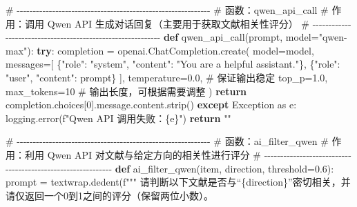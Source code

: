 \documentclass[
  letterpaper,
  DIV=11,
  numbers=noendperiod]{scrreprt}
\newenvironment{Shaded}{\begin{snugshade}}{\end{snugshade}}
\newcommand{\CommentTok}[1]{\textcolor[rgb]{0.37,0.37,0.37}{#1}}
\newcommand{\ControlFlowTok}[1]{\textcolor[rgb]{0.00,0.23,0.31}{\textbf{#1}}}
\newcommand{\DecValTok}[1]{\textcolor[rgb]{0.68,0.00,0.00}{#1}}
\newcommand{\FloatTok}[1]{\textcolor[rgb]{0.68,0.00,0.00}{#1}}
\newcommand{\ImportTok}[1]{\textcolor[rgb]{0.00,0.46,0.62}{#1}}
\newcommand{\KeywordTok}[1]{\textcolor[rgb]{0.00,0.23,0.31}{\textbf{#1}}}
\newcommand{\NormalTok}[1]{\textcolor[rgb]{0.00,0.23,0.31}{#1}}
\newcommand{\OperatorTok}[1]{\textcolor[rgb]{0.37,0.37,0.37}{#1}}
\newcommand{\PreprocessorTok}[1]{\textcolor[rgb]{0.68,0.00,0.00}{#1}}
\newcommand{\SpecialCharTok}[1]{\textcolor[rgb]{0.37,0.37,0.37}{#1}}
\newcommand{\SpecialStringTok}[1]{\textcolor[rgb]{0.13,0.47,0.30}{#1}}
\newcommand{\StringTok}[1]{\textcolor[rgb]{0.13,0.47,0.30}{#1}}
\begin{document}
\begin{Shaded}
\begin{Highlighting}[]
\CommentTok{\# {-}{-}{-}{-}{-}{-}{-}{-}{-}{-}{-}{-}{-}{-}{-}{-}{-}{-}{-}{-}{-}{-}{-}{-}{-}{-}{-}{-}{-}{-}{-}{-}{-}{-}{-}{-}{-}{-}{-}{-}{-}{-}{-}{-}{-}{-}{-}{-}{-}{-}{-}{-}{-}{-}{-}{-}{-}{-}{-}{-}}
\CommentTok{\# 函数：qwen\_api\_call}
\CommentTok{\# 作用：调用 Qwen API 生成对话回复（主要用于获取文献相关性评分）}
\CommentTok{\# {-}{-}{-}{-}{-}{-}{-}{-}{-}{-}{-}{-}{-}{-}{-}{-}{-}{-}{-}{-}{-}{-}{-}{-}{-}{-}{-}{-}{-}{-}{-}{-}{-}{-}{-}{-}{-}{-}{-}{-}{-}{-}{-}{-}{-}{-}{-}{-}{-}{-}{-}{-}{-}{-}{-}{-}{-}{-}{-}{-}}
\KeywordTok{def}\NormalTok{ qwen\_api\_call(prompt, model}\OperatorTok{=}\StringTok{"qwen{-}max"}\NormalTok{):}
    \ControlFlowTok{try}\NormalTok{:}
\NormalTok{        completion }\OperatorTok{=}\NormalTok{ openai.ChatCompletion.create(}
\NormalTok{            model}\OperatorTok{=}\NormalTok{model,}
\NormalTok{            messages}\OperatorTok{=}\NormalTok{[}
\NormalTok{                \{}\StringTok{"role"}\NormalTok{: }\StringTok{"system"}\NormalTok{, }\StringTok{"content"}\NormalTok{: }\StringTok{"You are a helpful assistant."}\NormalTok{\},}
\NormalTok{                \{}\StringTok{"role"}\NormalTok{: }\StringTok{"user"}\NormalTok{, }\StringTok{"content"}\NormalTok{: prompt\}}
\NormalTok{            ],}
\NormalTok{            temperature}\OperatorTok{=}\FloatTok{0.0}\NormalTok{,  }\CommentTok{\# 保证输出稳定}
\NormalTok{            top\_p}\OperatorTok{=}\FloatTok{1.0}\NormalTok{,}
\NormalTok{            max\_tokens}\OperatorTok{=}\DecValTok{10}    \CommentTok{\# 输出长度，可根据需要调整}
\NormalTok{        )}
        \ControlFlowTok{return}\NormalTok{ completion.choices[}\DecValTok{0}\NormalTok{].message.content.strip()}
    \ControlFlowTok{except} \PreprocessorTok{Exception} \ImportTok{as}\NormalTok{ e:}
\NormalTok{        logging.error(}\SpecialStringTok{f"Qwen API 调用失败：}\SpecialCharTok{\{}\NormalTok{e}\SpecialCharTok{\}}\SpecialStringTok{"}\NormalTok{)}
        \ControlFlowTok{return} \StringTok{""}

\CommentTok{\# {-}{-}{-}{-}{-}{-}{-}{-}{-}{-}{-}{-}{-}{-}{-}{-}{-}{-}{-}{-}{-}{-}{-}{-}{-}{-}{-}{-}{-}{-}{-}{-}{-}{-}{-}{-}{-}{-}{-}{-}{-}{-}{-}{-}{-}{-}{-}{-}{-}{-}{-}{-}{-}{-}{-}{-}{-}{-}{-}{-}}
\CommentTok{\# 函数：ai\_filter\_qwen}
\CommentTok{\# 作用：利用 Qwen API 对文献与给定方向的相关性进行评分}
\CommentTok{\# {-}{-}{-}{-}{-}{-}{-}{-}{-}{-}{-}{-}{-}{-}{-}{-}{-}{-}{-}{-}{-}{-}{-}{-}{-}{-}{-}{-}{-}{-}{-}{-}{-}{-}{-}{-}{-}{-}{-}{-}{-}{-}{-}{-}{-}{-}{-}{-}{-}{-}{-}{-}{-}{-}{-}{-}{-}{-}{-}{-}}
\KeywordTok{def}\NormalTok{ ai\_filter\_qwen(item, direction, threshold}\OperatorTok{=}\FloatTok{0.6}\NormalTok{):}
\NormalTok{    prompt }\OperatorTok{=}\NormalTok{ textwrap.dedent(}\SpecialStringTok{f"""}
\SpecialStringTok{        请判断以下文献是否与“}\SpecialCharTok{\{}\NormalTok{direction}\SpecialCharTok{\}}\SpecialStringTok{”密切相关，并请仅返回一个0到1之间的评分（保留两位小数）。}


\end{Highlighting}
\end{Shaded}
\end{document}
